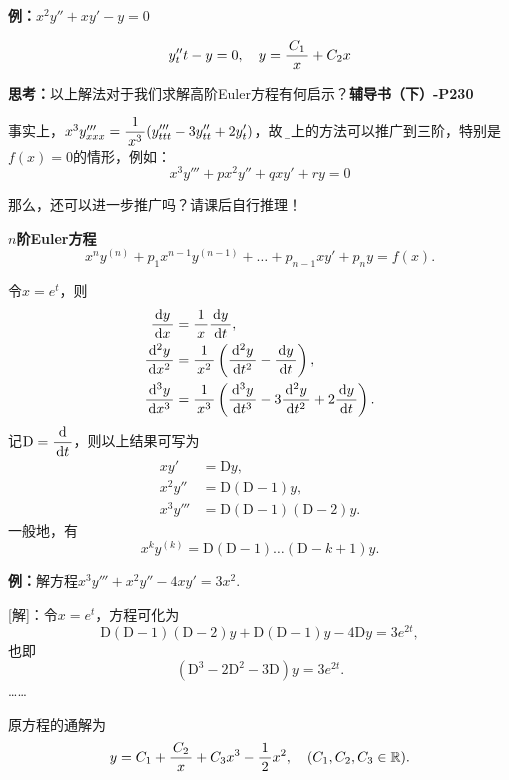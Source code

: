{\bf 例：}$x^2y''+xy'-y=0$

$$y''_tt-y=0,\quad y=\df{C_1}x+C_2x$$

{\bf 思考：}以上解法对于我们求解高阶Euler方程有何启示？\hfill{\bf 辅导书（下）-P230}

事实上，$x^3y'''_{xxx}=\df1{x^3}(y'''_{ttt}-3y''_{tt}+2y'_t)$，故
{\b 以上的方法可以推广到三阶}，特别是$f(x)=0$的情形，例如：
$$x^3y'''+px^2y''+qxy'+ry=0$$

那么，还可以进一步推广吗？请课后自行推理！

\begin{shaded}
	{\bf $n$阶Euler方程}
	$$x^ny^{(n)}+p_1x^{n-1}y^{(n-1)}+\ldots+p_{n-1}xy'
	+p_ny=f(x).$$
	
	令$x=e^t$，则
	\begin{align*}
		\df{\d y}{\d x}&=\df1x\df{\d y}{\d t},\\
		\df{\d^2 y}{\d x^2}&=\df1{x^2}\left(\df{\d^2 y}{\d t^2}
		-\df{\d y}{\d t}\right),\\
		\df{\d^3 y}{\d x^3}&=\df1{x^3}\left(\df{\d^3 y}{\d t^3}
		-3\df{\d^2 y}{\d t^2}+2\df{\d y}{\d t}\right).
	\end{align*}
	记$\mathrm{D}=\df{\d}{\d t}$，则以上结果可写为
	\begin{align*}
		xy'&=\mathrm{D}y,\\
		x^2y''&=\mathrm{D}(\mathrm{D}-1)y,\\
		x^3y'''&=\mathrm{D}(\mathrm{D}-1)(\mathrm{D}-2)y.
	\end{align*}
	一般地，有
	$$x^ky^{(k)}=\mathrm{D}(\mathrm{D}-1)\ldots(\mathrm{D}-k+1)y.$$
	
	{\bf 例：}解方程$x^3y'''+x^2y''-4xy'=3x^2$.
	
	[解]：令$x=e^t$，方程可化为
	$$\mathrm{D}(\mathrm{D}-1)(\mathrm{D}-2)y+\mathrm{D}(\mathrm{D}-1)y
	-4\mathrm{D}y=3e^{2t},$$
	也即
	$$(\mathrm{D}^3-2\mathrm{D}^2-3\mathrm{D})y=3e^{2t}.$$
	\ldots\ldots
	
	原方程的通解为
	$$y=C_1+\df{C_2}x+C_3x^3-\df12x^2,\quad(C_1,C_2,C_3\in\mathbb{R}).$$
\end{shaded}

